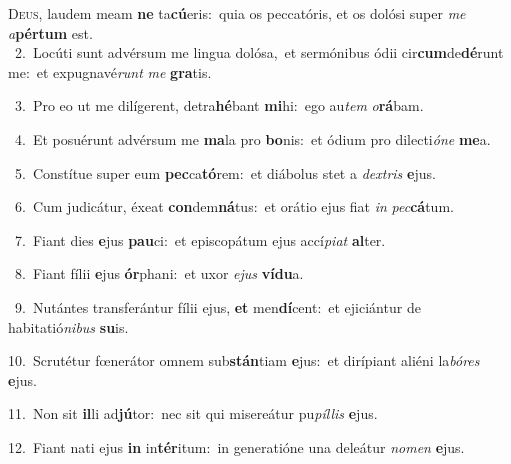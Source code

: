 \lettrine{\initial\textcolor{\initialcolor}{D}}{eus,} laudem meam \textbf{ne} ta\-\textbf{cú}\-eris:~\star quia os peccatóris, et os dolósi super \textit{me} \textit{a}\-\textbf{pér}\textbf{tum} est.\\
{\numbfont\textcolor{\numbcolor}{~2.}}~Locúti sunt advérsum me lingua dolósa,~\dagger et sermónibus ódii cir\-\textbf{cum}\-de\-\textbf{dé}\-runt me:~\star et expugnavé\textit{runt} \textit{me} \textbf{gra}\-tis.\par
{\numbfont\textcolor{\numbcolor}{~3.}}~Pro eo ut me dilígerent, detra\-\textbf{hé}\-bant \textbf{mi}\-hi:~\star ego au\textit{tem} \textit{o}\-\textbf{rá}bam.\par
{\numbfont\textcolor{\numbcolor}{~4.}}~Et posuérunt advérsum me \textbf{ma}\-la pro \textbf{bo}\-nis:~\star et ódium pro dilecti\-\textit{ó}\-\textit{ne} \textbf{me}\-a.\par
{\numbfont\textcolor{\numbcolor}{~5.}}~Constítue super eum \textbf{pec}\-ca\-\textbf{tó}\-rem:~\star et diábolus stet a \textit{dex}\-\textit{tris} \textbf{e}\-jus.\par
{\numbfont\textcolor{\numbcolor}{~6.}}~Cum judicátur, éxeat \textbf{con}\-dem\-\textbf{ná}\-tus:~\star et orátio ejus fiat \textit{in} \textit{pec}\-\textbf{cá}tum.\par
{\numbfont\textcolor{\numbcolor}{~7.}}~Fiant dies \textbf{e}\-jus \textbf{pau}\-ci:~\star et episcopátum ejus accí\-\textit{pi}\-\textit{at} \textbf{al}\-ter.\par
{\numbfont\textcolor{\numbcolor}{~8.}}~Fiant fílii \textbf{e}\-jus \textbf{ór}\-phani:~\star et uxor \textit{e}\-\textit{jus} \textbf{ví}\-\textbf{du}a.\par
{\numbfont\textcolor{\numbcolor}{~9.}}~Nutántes transferántur fílii ejus, \textbf{et} men\-\textbf{dí}\-cent:~\star et ejiciántur de habitatió\-\textit{ni}\-\textit{bus} \textbf{su}\-is.\par
{\numbfont\textcolor{\numbcolor}{10.}}~Scrutétur fœnerátor omnem sub\-\textbf{stán}\-tiam \textbf{e}\-jus:~\star et dirípiant aliéni la\-\textit{bó}\-\textit{res} \textbf{e}\-jus.\par
{\numbfont\textcolor{\numbcolor}{11.}}~Non sit \textbf{il}\-li ad\-\textbf{jú}\-tor:~\star nec sit qui misereátur pu\-\textit{píl}\-\textit{lis} \textbf{e}\-jus.\par
{\numbfont\textcolor{\numbcolor}{12.}}~Fiant nati ejus \textbf{in} in\-\textbf{tér}\-itum:~\star in generatióne una deleátur \textit{no}\-\textit{men} \textbf{e}\-jus.\par
